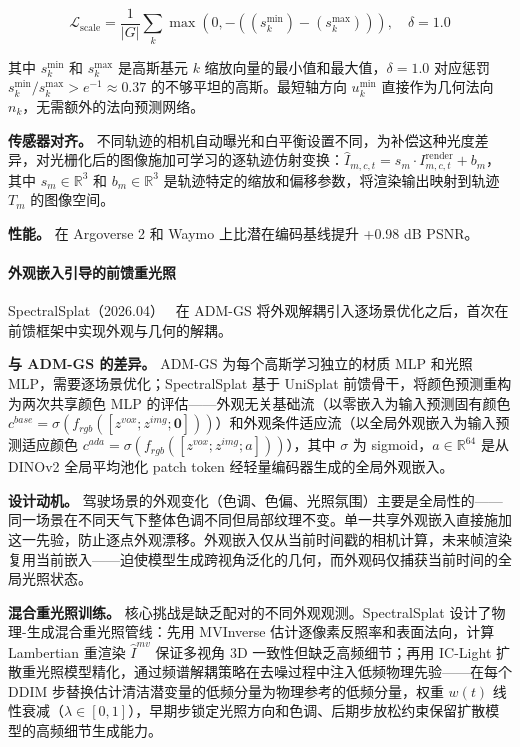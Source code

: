 \begin{equation}
\mathcal{L}_{\text{scale}} = \frac{1}{|G|}\sum_k \max(0, -((s_k^{\min}) - (s_k^{\max}))), \quad \delta = 1.0
\end{equation}

其中 $s_k^{\min}$ 和 $s_k^{\max}$ 是高斯基元 $k$ 缩放向量的最小值和最大值，$\delta=1.0$ 对应惩罚 $s_k^{\min}/s_k^{\max} > e^{-1} \approx 0.37$ 的不够平坦的高斯。最短轴方向 $u_k^{\min}$ 直接作为几何法向 $n_k$，无需额外的法向预测网络。

\textbf{传感器对齐。} 不同轨迹的相机自动曝光和白平衡设置不同，为补偿这种光度差异，对光栅化后的图像施加可学习的逐轨迹仿射变换：$\hat{I}_{m,c,t} = s_m \cdot I^{\text{render}}_{m,c,t} + b_m$，其中 $s_m \in \mathbb{R}^3$ 和 $b_m \in \mathbb{R}^3$ 是轨迹特定的缩放和偏移参数，将渲染输出映射到轨迹 $T_m$ 的图像空间。

\textbf{性能。} 在 Argoverse 2 和 Waymo 上比潜在编码基线提升 +0.98 dB PSNR。

\paragraph{外观嵌入引导的前馈重光照}

SpectralSplat（2026.04）~\cite{2604_03462} 在 ADM-GS 将外观解耦引入逐场景优化之后，首次在前馈框架中实现外观与几何的解耦。

\textbf{与 ADM-GS 的差异。} ADM-GS 为每个高斯学习独立的材质 MLP 和光照 MLP，需要逐场景优化；SpectralSplat 基于 UniSplat 前馈骨干，将颜色预测重构为两次共享颜色 MLP 的评估——外观无关基础流（以零嵌入为输入预测固有颜色 $c^{base} = \sigma(f_{rgb}([z^{vox}; z^{img}; \mathbf{0}]))$）和外观条件适应流（以全局外观嵌入为输入预测适应颜色 $c^{ada} = \sigma(f_{rgb}([z^{vox}; z^{img}; a]))$），其中 $\sigma$ 为 sigmoid，$a \in \mathbb{R}^{64}$ 是从 DINOv2 全局平均池化 patch token 经轻量编码器生成的全局外观嵌入。

\textbf{设计动机。} 驾驶场景的外观变化（色调、色偏、光照氛围）主要是全局性的——同一场景在不同天气下整体色调不同但局部纹理不变。单一共享外观嵌入直接施加这一先验，防止逐点外观漂移。外观嵌入仅从当前时间戳的相机计算，未来帧渲染复用当前嵌入——迫使模型生成跨视角泛化的几何，而外观码仅捕获当前时间的全局光照状态。

\textbf{混合重光照训练。} 核心挑战是缺乏配对的不同外观观测。SpectralSplat 设计了物理-生成混合重光照管线：先用 MVInverse 估计逐像素反照率和表面法向，计算 Lambertian 重渲染 $\hat{I}^{mv}$ 保证多视角 3D 一致性但缺乏高频细节；再用 IC-Light 扩散重光照模型精化，通过频谱解耦策略在去噪过程中注入低频物理先验——在每个 DDIM 步替换估计清洁潜变量的低频分量为物理参考的低频分量，权重 $w(t)$ 线性衰减（$\lambda \in [0,1]$），早期步锁定光照方向和色调、后期步放松约束保留扩散模型的高频细节生成能力。

